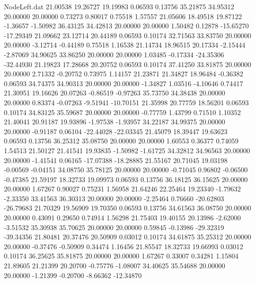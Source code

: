 \begin{filecontents}{NodeLeft.dat}
  21.00538   19.26727   19.19983     0.06593    0.13756   35.21875   34.95312   20.00000   20.00000    0.73273    0.80017    0.75518    1.57557
  21.05606   18.49518   19.87122    -1.36657   -1.50982   36.43125   34.42813   20.00000   20.00000    1.50482    0.12878  -15.65270  -17.29349
  21.09662   23.12714   20.44189     0.06593    0.10174   32.71563   33.83750   20.00000   20.00000   -3.12714   -0.44189    0.75518    1.16538
  21.14734   18.96515   20.17334    -2.15444   -2.87069   34.90625   33.86250   20.00000   20.00000    1.03485   -0.17334  -24.35306  -32.44930
  21.19823   17.28668   20.20752     0.06593    0.10174   37.41250   33.81875   20.00000   20.00000    2.71332   -0.20752    0.73975    1.14157
  21.23871   21.34827   18.96484    -0.36382    0.06593   34.74375   34.90313   20.00000   20.00000   -1.34827    1.03516   -4.10646    0.74417
  21.30951   19.16626   20.07263    -0.86519   -0.97263   35.73750   34.38438   20.00000   20.00000    0.83374   -0.07263   -9.51941  -10.70151
  21.35998   20.77759   18.56201     0.06593    0.10174   34.83125   35.59687   20.00000   20.00000   -0.77759    1.43799    0.71510    1.10352
  21.40041   20.91187   19.93896    -1.97538   -1.93957   34.22187   34.99375   20.00000   20.00000   -0.91187    0.06104  -22.44028  -22.03345
  21.45079   18.39447   19.63623     0.06593    0.13756   36.25312   35.08750   20.00000   20.00000    1.60553    0.36377    0.74059    1.54513
  21.50127   21.41541   19.93835    -1.50982   -1.61725   34.32812   34.96563   20.00000   20.00000   -1.41541    0.06165  -17.07388  -18.28885
  21.55167   20.71045   19.03198    -0.00569   -0.04151   34.08750   35.78125   20.00000   20.00000   -0.71045    0.96802   -0.06500   -0.47385
  21.59197   18.32733   19.09973     0.06593    0.13756   36.18125   36.15625   20.00000   20.00000    1.67267    0.90027    0.75231    1.56958
  21.64246   22.25464   19.23340    -1.79632   -2.33350   33.41563   36.30313   20.00000   20.00000   -2.25464    0.76660  -20.62803  -26.79683
  21.70329   19.56909   19.70350     0.06593    0.13756   34.61563   36.08750   20.00000   20.00000    0.43091    0.29650    0.74914    1.56298
  21.75403   19.40155   20.13986    -2.62000   -3.51532   35.30938   35.70625   20.00000   20.00000    0.59845   -0.13986  -29.32319  -39.34356
  21.80481   20.37476   20.50909     0.03012    0.10174   34.61875   35.25312   20.00000   20.00000   -0.37476   -0.50909    0.34474    1.16456
  21.85547   18.32733   19.66993     0.03012    0.10174   36.25625   35.81875   20.00000   20.00000    1.67267    0.33007    0.34281    1.15804
  21.89605   21.21399   20.20700    -0.75776   -1.08007   34.40625   35.54688   20.00000   20.00000   -1.21399   -0.20700   -8.66362  -12.34870

\end{filecontents}
